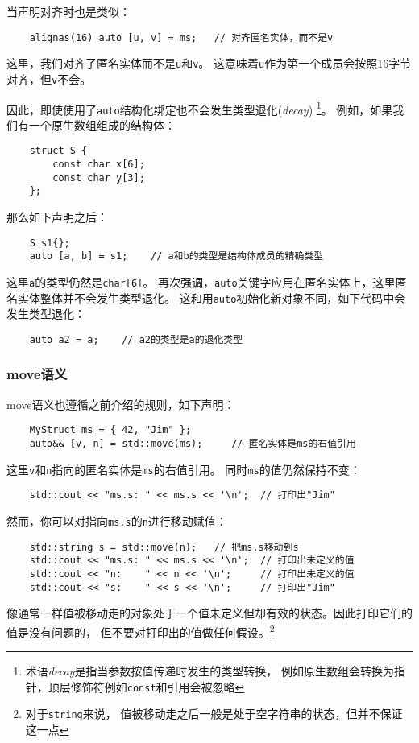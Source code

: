 当声明对齐时也是类似：
\begin{lstlisting}
    alignas(16) auto [u, v] = ms;   // 对齐匿名实体，而不是v
\end{lstlisting}
这里，我们对齐了匿名实体而不是\texttt{u}和\texttt{v}。
这意味着\texttt{u}作为第一个成员会按照16字节对齐，但\texttt{v}不会。

因此，即使使用了\texttt{auto}结构化绑定也不会发生类型退化(\emph{decay})
\footnote{术语\emph{decay}是指当参数按值传递时发生的类型转换，
例如原生数组会转换为指针，顶层修饰符例如\texttt{const}和引用会被忽略}。
例如，如果我们有一个原生数组组成的结构体：
\begin{lstlisting}
    struct S {
        const char x[6];
        const char y[3];
    };
\end{lstlisting}
那么如下声明之后：
\begin{lstlisting}
    S s1{};
    auto [a, b] = s1;    // a和b的类型是结构体成员的精确类型
\end{lstlisting}
这里\texttt{a}的类型仍然是\texttt{char[6]}。
再次强调，\texttt{auto}关键字应用在匿名实体上，这里匿名实体整体并不会发生类型退化。
这和用\texttt{auto}初始化新对象不同，如下代码中会发生类型退化：
\begin{lstlisting}
    auto a2 = a;    // a2的类型是a的退化类型
\end{lstlisting}

\subsubsection*{move语义}
move语义也遵循之前介绍的规则，如下声明：
\begin{lstlisting}
    MyStruct ms = { 42, "Jim" };
    auto&& [v, n] = std::move(ms);     // 匿名实体是ms的右值引用
\end{lstlisting}
这里\texttt{v}和\texttt{n}指向的匿名实体是\texttt{ms}的右值引用。
同时\texttt{ms}的值仍然保持不变：
\begin{lstlisting}
    std::cout << "ms.s: " << ms.s << '\n';  // 打印出"Jim"
\end{lstlisting}
然而，你可以对指向\texttt{ms.s}的\texttt{n}进行移动赋值：
\begin{lstlisting}
    std::string s = std::move(n);   // 把ms.s移动到s
    std::cout << "ms.s: " << ms.s << '\n';  // 打印出未定义的值
    std::cout << "n:    " << n << '\n';     // 打印出未定义的值
    std::cout << "s:    " << s << '\n';     // 打印出"Jim"
\end{lstlisting}
像通常一样值被移动走的对象处于一个值未定义但却有效的状态。因此打印它们的值是没有问题的，
但不要对打印出的值做任何假设。\footnote{对于\texttt{string}来说，
值被移动走之后一般是处于空字符串的状态，但并不保证这一点}

